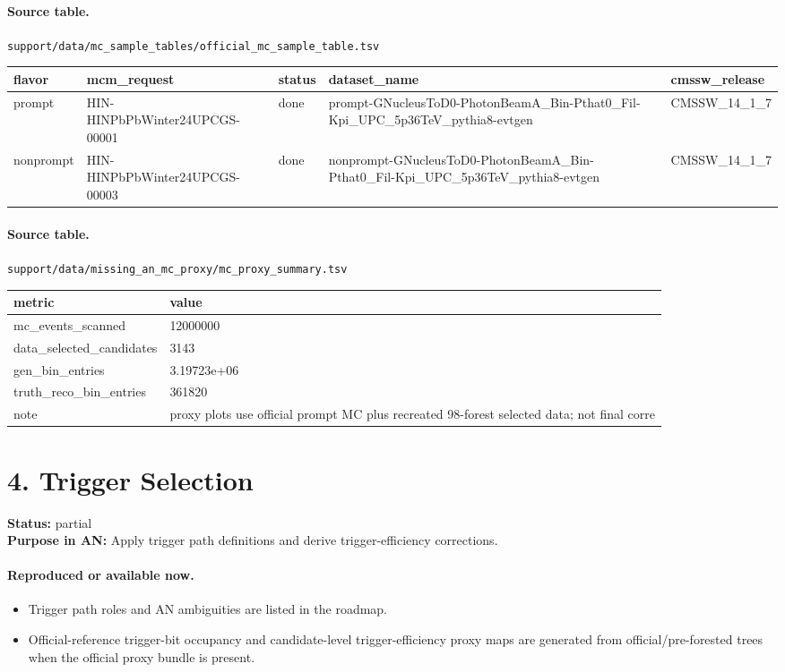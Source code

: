 \documentclass[11pt]{article}
\begin{document}
\paragraph{Source table.} \texttt{support/data/mc\_sample\_tables/official\_mc\_sample\_table.tsv}
\begin{center}\scriptsize
\begin{tabular}{|l|l|l|l|l|}
\hline
flavor & mcm\_request & status & dataset\_name & cmssw\_release \\ \hline
prompt & HIN-HINPbPbWinter24UPCGS-00001 & done & prompt-GNucleusToD0-PhotonBeamA\_Bin-Pthat0\_Fil-Kpi\_UPC\_5p36TeV\_pythia8-evtgen & CMSSW\_14\_1\_7 \\ \hline
nonprompt & HIN-HINPbPbWinter24UPCGS-00003 & done & nonprompt-GNucleusToD0-PhotonBeamA\_Bin-Pthat0\_Fil-Kpi\_UPC\_5p36TeV\_pythia8-evtgen & CMSSW\_14\_1\_7 \\ \hline
\end{tabular}
\end{center}
\paragraph{Source table.} \texttt{support/data/missing\_an\_mc\_proxy/mc\_proxy\_summary.tsv}
\begin{center}\scriptsize
\begin{tabular}{|l|l|}
\hline
metric & value \\ \hline
mc\_events\_scanned & 12000000 \\ \hline
data\_selected\_candidates & 3143 \\ \hline
gen\_bin\_entries & 3.19723e+06 \\ \hline
truth\_reco\_bin\_entries & 361820 \\ \hline
note & proxy plots use official prompt MC plus recreated 98-forest selected data; not final corre \\ \hline
\end{tabular}
\end{center}
\section*{4. Trigger Selection}
\textbf{Status:} partial\\
\textbf{Purpose in AN:} Apply trigger path definitions and derive trigger-efficiency corrections.
\paragraph{Reproduced or available now.}
\begin{itemize}
\item Trigger path roles and AN ambiguities are listed in the roadmap.
\item Official-reference trigger-bit occupancy and candidate-level trigger-efficiency proxy maps are generated from official/pre-forested trees when the official proxy bundle is present.
\end{itemize}
\end{document}
